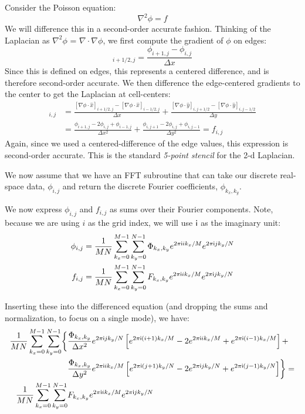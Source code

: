 Consider the Poisson equation:
\begin{equation}
\nabla^2 \phi = f
\end{equation}
We will difference this in a second-order accurate fashion.  Thinking
of the Laplacian as $\nabla^2 \phi$ = $\nabla \cdot \nabla \phi$, we
first compute the gradient of $\phi$ on edges:
\begin{equation}
[\nabla \phi \cdot \hat{x}]_{i+1/2,j} = \frac{\phi_{i+1,j} - \phi_{i,j}}{\Delta x}
\end{equation}
Since this is defined on edges, this represents a centered difference, and is
therefore second-order accurate.  We then difference the edge-centered
gradients to the center to get the Laplacian at cell-centers:
\begin{align}
[\nabla^2 \phi]_{i,j} &=
   \frac{[\nabla \phi \cdot \hat{x}]_{i+1/2,j} -
         [\nabla \phi \cdot \hat{x}]_{i-1/2,j}}{\Delta x} +
   \frac{[\nabla \phi \cdot \hat{y}]_{i,j+1/2} -
         [\nabla \phi \cdot \hat{y}]_{i,j-1/2}}{\Delta y} \nonumber\\
%
  &= \frac{\phi_{i+1,j} - 2\phi_{i,j} + \phi_{i-1,j}}{\Delta x^2} +
     \frac{\phi_{i,j+1} - 2\phi_{i,j} + \phi_{i,j-1}}{\Delta y^2} = f_{i,j}
\end{align}        
Again, since we used a centered-difference of the edge values, this
expression is second-order accurate.  This is the standard
{\em 5-point stencil} for the 2-d Laplacian.

We now assume that we have an FFT subroutine that can take our
discrete real-space data, $\phi_{i,j}$ and return the discrete
Fourier coefficients, $\phi_{k_x,k_y}$.

We now express $\phi_{i,j}$ and $f_{i,j}$ as sums over their Fourier
components.  Note, because we are using $i$ as the grid index, we will
use $\mathsf{i}$ as the imaginary unit:
\begin{align}
\phi_{i,j} &= \frac{1}{MN} \sum_{k_x = 0}^{M-1} \sum_{k_y = 0}^{N-1}
  \Phi_{k_x,k_y} e^{2\pi\mathsf{i} i k_x/M} e^{2\pi\mathsf{i} j k_y/N} \\
f_{i,j} &= \frac{1}{MN} \sum_{k_x = 0}^{M-1} \sum_{k_y = 0}^{N-1}
  F_{k_x,k_y} e^{2\pi\mathsf{i} i k_x/M} e^{2\pi\mathsf{i} j k_y/N} 
\end{align}

Inserting these into the differenced equation (and dropping the sums
and normalization, to focus on a single mode), we have:
\begin{align}
\frac{1}{MN}\sum_{k_x=0}^{M-1}\sum_{k_y=0}^{N-1}
\biggl \{
&\frac{\Phi_{k_x,k_y}}{\Delta x^2} e^{2\pi\mathsf{i} j k_y/N}
  \left [ e^{2\pi\mathsf{i} (i+1) k_x/M} -2 e^{2\pi\mathsf{i} i k_x/M} +
         e^{2\pi\mathsf{i} (i-1) k_x/M} \right ] + \nonumber \\
&\frac{\Phi_{k_x,k_y}}{\Delta y^2} e^{2\pi\mathsf{i} i k_x/M}
  \left [ e^{2\pi\mathsf{i} (j+1) k_y/N} -2 e^{2\pi\mathsf{i} j k_y/N} +
         e^{2\pi\mathsf{i} (j-1) k_y/N} \right ] \biggr \} = \nonumber \\
\frac{1}{MN}\sum_{k_x=0}^{M-1}\sum_{k_y=0}^{N-1}
 & F_{k_x,k_y} e^{2\pi\mathsf{i} i k_x/M} e^{2\pi\mathsf{i} j k_y/N}
\end{align}

